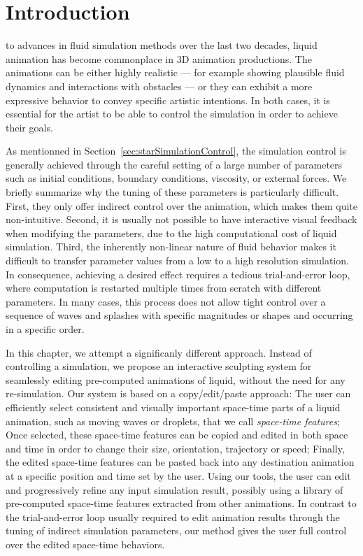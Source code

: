 \section{Introduction} \label{sec:fluidsculpting:introduction}

 to advances in fluid simulation methods over the last two decades, liquid animation has become commonplace in 3D animation productions. 
The animations can be either highly realistic --- for example showing plausible fluid dynamics and interactions with obstacles --- or they can exhibit a more expressive behavior to convey specific artistic intentions. In both cases, it is essential for the artist to be able to control the simulation in order to achieve their goals.

As mentionned in Section~\ref{sec:starSimulationControl}, the simulation control is generally achieved through the careful setting of a large number of parameters such as initial conditions, boundary conditions, viscosity, or external forces. 
We briefly summarize why the tuning of these parameters is particularly difficult.
First, they only offer indirect control over the animation, which makes them quite non-intuitive. 
Second, it is usually not possible to have interactive visual feedback when modifying the parameters, due to the high computational cost of 
liquid simulation.
Third, the inherently non-linear nature of fluid behavior makes it difficult to transfer parameter values from a low to a high resolution simulation. 
In consequence, achieving a desired effect requires a tedious trial-and-error loop, where computation is restarted multiple times from scratch with different parameters. 
In many cases, this process does not allow tight control over a sequence of waves and splashes with specific magnitudes or shapes and occurring in a specific order. 

In this chapter, we attempt a significanly different approach.
Instead of controlling a simulation, we propose an interactive sculpting system for seamlessly editing pre-computed animations of liquid, without the need for any re-simulation. 
Our system is based on a copy/edit/paste approach:
The user can efficiently select consistent and visually important space-time parts of a liquid animation, such as moving waves or droplets, that we call \emph{space-time features};
Once selected, these space-time features can be copied and edited in both space and time in order to change their size, orientation, trajectory or speed;
Finally, the edited space-time features can be pasted back into any destination animation at a specific position and time set by the user.
Using our tools, the user can edit and progressively refine any input simulation result, possibly using a library of pre-computed space-time features extracted from other animations. 
In contrast to the trial-and-error loop usually required to edit animation results through the tuning of indirect simulation parameters, our method gives the user full control over the edited space-time behaviors. 

